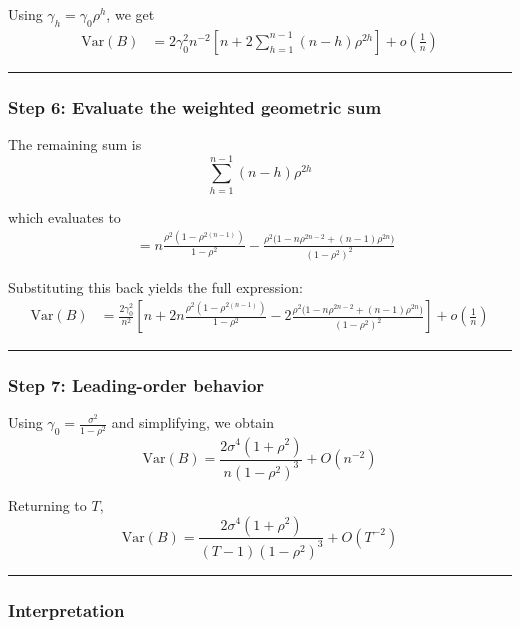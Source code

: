 \documentclass[11pt]{article}
\begin{document}
Using \(\gamma_h = \gamma_0 \rho^h\), we get \[
\begin{aligned}
\text{Var}(B)
&= 2\gamma_0^2 n^{-2}\left[n+2\sum_{h=1}^{n-1}(n-h)\rho^{2h}\right]+o\!\left(\frac{1}{n}\right)
\end{aligned}
\]

\begin{center}\rule{0.5\linewidth}{0.5pt}\end{center}

\subsubsection{Step 6: Evaluate the weighted geometric
sum}\label{step-6-evaluate-the-weighted-geometric-sum}

The remaining sum is \[
\sum_{h=1}^{n-1}(n-h)\rho^{2h}
\]

which evaluates to \[
\begin{aligned}
&=
n\frac{\rho^2(1-\rho^{2(n-1)})}{1-\rho^2}
-
\frac{\rho^2\bigl(1-n\rho^{2n-2}+(n-1)\rho^{2n}\bigr)}{(1-\rho^2)^2}
\end{aligned}
\]

Substituting this back yields the full expression: \[
\begin{aligned}
\text{Var}(B)
&=
\frac{2\gamma_0^2}{n^2}
\left[
n
+
2n\frac{\rho^2(1-\rho^{2(n-1)})}{1-\rho^2}
-
2\frac{\rho^2\bigl(1-n\rho^{2n-2}+(n-1)\rho^{2n}\bigr)}{(1-\rho^2)^2}
\right]
+o\!\left(\frac{1}{n}\right)
\end{aligned}
\]

\begin{center}\rule{0.5\linewidth}{0.5pt}\end{center}

\subsubsection{Step 7: Leading-order
behavior}\label{step-7-leading-order-behavior}

Using \(\gamma_0 = \frac{\sigma^2}{1-\rho^2}\) and simplifying, we
obtain \[
\text{Var}(B)
=
\frac{2\sigma^4(1+\rho^2)}{n(1-\rho^2)^3}
+O\!\left(n^{-2}\right)
\]

Returning to \(T\), \[
\text{Var}(B)
=
\frac{2\sigma^4(1+\rho^2)}{(T-1)(1-\rho^2)^3}
+O\!\left(T^{-2}\right)
\]

\begin{center}\rule{0.5\linewidth}{0.5pt}\end{center}

\subsubsection{Interpretation}\label{interpretation}
\end{document}
